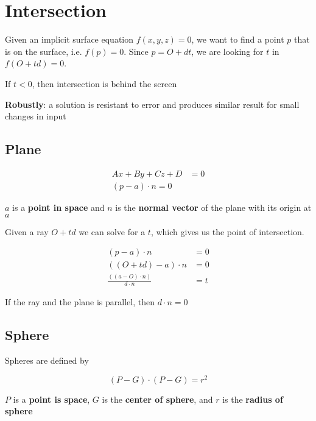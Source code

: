 \chapter{Intersection}

Given an implicit surface equation $ f\left( x, y, z \right) = 0 $, we
want to find a point $ p $ that is on the surface,
i.e. $ f\left( p \right) = 0 $. Since $ p = O + dt $, we are looking for
$ t $ in $ f\left( O + td \right) = 0 $.

If $ t < 0 $, then intersection is behind the screen

\textbf{Robustly}: a solution is resistant to error and produces similar
result for small changes in input

\section{Plane}

  \begin{align}
    Ax + By + Cz + D &= 0 \\
    \left( p - a \right) \cdot n = 0
  \end{align}

  $ a $ is a \textbf{point in space} and $ n $ is the \textbf{normal vector}
  of the plane with its origin at $ a $

  Given a ray $ O + td $ we can solve for a $ t $, which gives us the
  point of intersection.

  \begin{align*}
    \left( p - a \right) \cdot n &= 0 \\
    \left( \left( O + td \right) - a \right) \cdot n &= 0 \\
    \frac{\left( \left( a - O \right) \cdot n \right)}{d \cdot n} &= t
  \end{align*}

  If the ray and the plane is parallel, then $ d \cdot n = 0 $

\section{Sphere}

  Spheres are defined by

  \begin{equation}
    \left( P - G \right) \cdot \left( P - G \right) = r^{2}
  \end{equation}

  $ P $ is a \textbf{point is space}, $ G $ is the \textbf{center of sphere},
  and $ r $ is the \textbf{radius of sphere}

